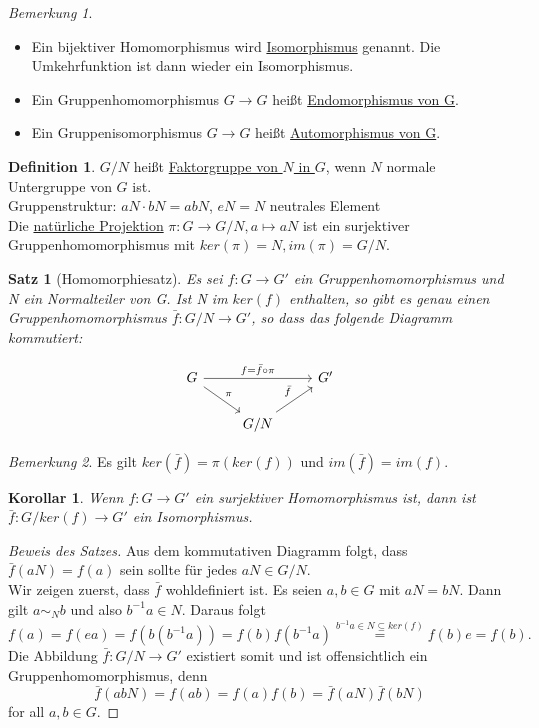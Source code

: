 \documentclass[12pt]{scrartcl}%
\newtheorem{thm}{Satz}
\newtheorem{kor}{Korollar}
\theoremstyle{definition}
\newtheorem*{defn}{Definition}
\theoremstyle{remark}
\newtheorem*{nb}{Bemerkung}
\begin{document}
\begin{nb}
	\begin{itemize}
		\item Ein bijektiver Homomorphismus wird \underline{Isomorphismus} genannt. Die Umkehrfunktion ist dann wieder ein Isomorphismus.
		\item Ein Gruppenhomomorphismus $G \rightarrow G$ heißt \underline{Endomorphismus von G}.
		\item Ein Gruppenisomorphismus $G \rightarrow G$ heißt \underline{Automorphismus von G}.
	\end{itemize}
\end{nb}

\begin{defn}
	$G/N$ heißt \underline{Faktorgruppe von $N$ in $G$}, wenn $N$ normale Untergruppe von $G$ ist. \\
	Gruppenstruktur: $aN \cdot bN = abN$, $eN = N$ neutrales Element \\
	Die \underline{natürliche Projektion} $\pi : G \rightarrow G/N, a \mapsto aN$ ist ein surjektiver Gruppenhomomorphismus mit $ker(\pi) = N, im(\pi) = G/N$.
\end{defn}

\begin{thm}[Homomorphiesatz]
	Es sei $f: G \rightarrow G'$ ein Gruppenhomomorphismus und N ein Normalteiler von G. Ist N im $ker(f)$ enthalten, so gibt es genau einen Gruppenhomomorphismus $\bar{f}: G/N \rightarrow G'$, so dass das folgende Diagramm kommutiert:

    \[ \begin{tikzcd}
            G \arrow[rr,"f=\bar f\circ \pi"] \arrow[rd,"\pi"] & & G'  \\
                                             & G/N \arrow[ru,"\bar f"] &
    \end{tikzcd} \]
\end{thm}

\begin{nb}
	Es gilt $ker(\bar{f}) = \pi(ker(f))$ und $im(\bar{f}) = im(f)$. 
\end{nb}

\begin{kor}
	Wenn $f: G \rightarrow G'$ ein surjektiver Homomorphismus ist, dann ist $\bar{f}: G/ker(f) \rightarrow G'$ ein Isomorphismus.
\end{kor}

\begin{proof}[Beweis des Satzes]
	Aus dem kommutativen Diagramm folgt, dass $\bar{f}(aN) = f(a)$ sein sollte für jedes $aN \in G/N$. \\
	Wir zeigen zuerst, dass $\bar{f}$ wohldefiniert ist. Es seien $a, b \in G$ mit $aN = bN$. Dann gilt $a \sim_{N} b$ und also $b^{-1}a \in N$. Daraus folgt
	$$f(a) = f(ea) = f(b(b^{-1}a)) = f(b) f(b^{-1}a) \stackrel{b^{-1}a \in N \subseteq ker(f)}{=} f(b)e = f(b).$$
	Die Abbildung $\bar{f}: G/N \rightarrow G'$ existiert somit und ist offensichtlich ein Gruppenhomomorphismus, denn
	$$\bar{f}(abN) = f(ab) = f(a)f(b) = \bar{f}(aN)\bar{f}(bN)$$ for all $a, b \in G$.
\end{proof}
\end{document}
